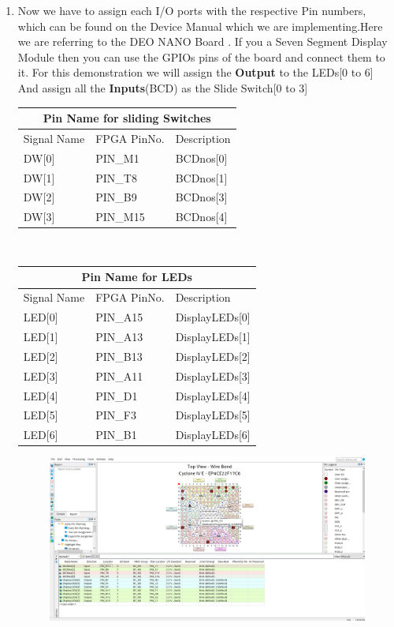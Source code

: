 \documentclass[12pt,singleside,a4paper]{article}
\begin{document}
\begin{enumerate}
    \item Now we have to assign each I/O ports with the respective Pin numbers, which can be found on the Device Manual which we are implementing.Here we are referring to the DEO NANO Board . If you a Seven Segment Display Module then you can use the GPIOs pins of the board and connect them to it. For this demonstration we will assign the \textbf{Output} to the LEDs[0 to 6] And assign all the \textbf{Inputs}(BCD) as the Slide Switch[0 to 3]
    \begin{center}
\begin{tabular}{ |p{3cm}|p{3cm}|p{3cm}|  } \hline
 \multicolumn{3}{|c|}{Pin Name for sliding Switches} \\ \hline \hline
Signal Name &   FPGA PinNo. &   Description         \\ \hline
DW[0]       &	PIN\_M1     &   BCDnos[0]   \\\hline
DW[1]       &	PIN\_T8      &   BCDnos[1]       \\\hline
DW[2]       &	PIN\_B9      &   BCDnos[3] 	    \\\hline
DW[3]       &	PIN\_M15      &   BCDnos[4]     \\\hline
\end{tabular}
\\
\begin{tabular}{ |p{3cm}|p{3cm}|p{3cm}| } \hline
 \multicolumn{3}{|c|}{Pin Name for LEDs} \\ \hline \hline
Signal Name &   FPGA PinNo. &   Description         \\ \hline
LED[0]       &	PIN\_A15         &   DisplayLEDs[0]      \\\hline
LED[1]       &	PIN\_A13        &   DisplayLEDs[1]      \\\hline
LED[2]       &	PIN\_B13         &   DisplayLEDs[2]	    \\\hline
LED[3]       &	PIN\_A11         &   DisplayLEDs[3]      \\\hline
LED[4]       &	PIN\_D1        &   DisplayLEDs[4]      \\\hline
LED[5]       &	PIN\_F3        &   DisplayLEDs[5]      \\\hline
LED[6]       &	PIN\_B1         &   DisplayLEDs[6]	    \\\hline
\end{tabular}
 \end{center}
    \begin{figure}[H]
    \centering
    \includegraphics[width=14cm,keepaspectratio]{Project/Create9.png}

\end{figure}
\end{enumerate}
\end{document}
